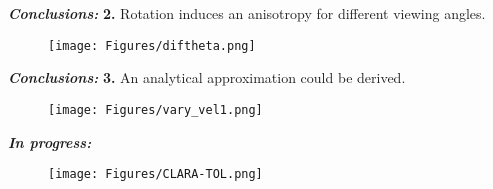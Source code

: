 \documentclass{beamer}
\begin{document}
\begin{frame}{\textit{\textbf{Conclusions:}}}
\textbf{2.} Rotation induces an anisotropy for different viewing angles.
\begin{figure}
\texttt{[image: Figures/diftheta.png]}
\end{figure}
\end{frame}


\begin{frame}{\textit{\textbf{Conclusions:}}}
\textbf{3.} An analytical approximation could be derived.
\begin{figure}
\texttt{[image: Figures/vary\_vel1.png]}
\end{figure}
\end{frame}

\begin{frame}{\textit{\textbf{In progress:}}}
\begin{figure}
\texttt{[image: Figures/CLARA-TOL.png]}
\end{figure}
\end{frame}

\end{document}
